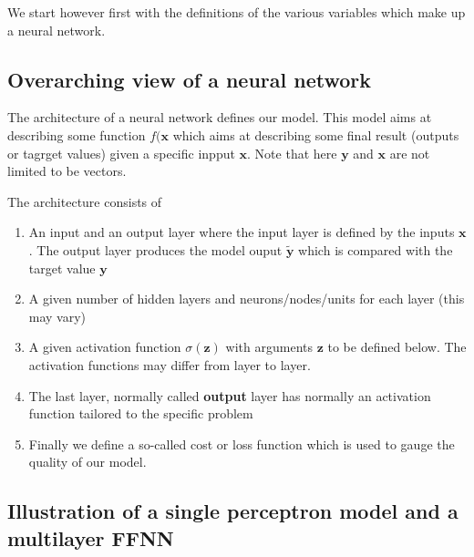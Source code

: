 \documentclass[%
oneside,                 %
final,                   %
10pt]{article}
\begin{document}
We start however first with the  definitions of the various variables which make up a neural network.

\subsection{Overarching view of a neural network}

The architecture of a neural network defines our model. This model
aims at describing some function $f(\bm{x}$ which aims at describing
some final result (outputs or tagrget values) given a specific inpput
$\bm{x}$. Note that here $\bm{y}$ and $\bm{x}$ are not limited to be
vectors.

The architecture consists of
\begin{enumerate}
\item An input and an output layer where the input layer is defined by the inputs $\bm{x}$. The output layer produces the model ouput $\bm{\tilde{y}}$ which is compared with the target value $\bm{y}$

\item A given number of hidden layers and neurons/nodes/units for each layer (this may vary)

\item A given activation function $\sigma(\bm{z})$ with arguments $\bm{z}$ to be defined below. The activation functions may differ from layer to layer.

\item The last layer, normally called \textbf{output} layer has normally an activation function tailored to the specific problem

\item Finally we define a so-called cost or loss function which is used to gauge the quality of our model. 
\end{enumerate}

\noindent
\subsection{Illustration of a single perceptron model and a multilayer FFNN}
\end{document}
